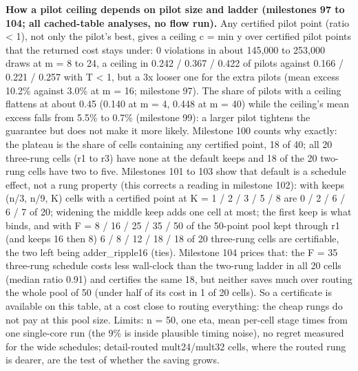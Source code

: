 \documentclass[conference]{IEEEtran}
\begin{document}
\textbf{How a pilot ceiling depends on pilot size and ladder (milestones
97 to 104; all cached-table analyses, no flow run).} Any certified pilot
point (ratio \textless{} 1), not only the pilot's best, gives a ceiling
c = min y over certified pilot points that the returned cost stays
under: 0 violations in about 145,000 to 253,000 draws at m = 8 to 24, a
ceiling in 0.242 / 0.367 / 0.422 of pilots against 0.166 / 0.221 / 0.257
with T \textless{} 1, but a 3x looser one for the extra pilots (mean
excess 10.2\% against 3.0\% at m = 16; milestone 97). The share of
pilots with a ceiling flattens at about 0.45 (0.140 at m = 4, 0.448 at m
= 40) while the ceiling's mean excess falls from 5.5\% to 0.7\%
(milestone 99): a larger pilot tightens the guarantee but does not make
it more likely. Milestone 100 counts why exactly: the plateau is the
share of cells containing any certified point, 18 of 40; all 20
three-rung cells (r1 to r3) have none at the default keeps and 18 of the
20 two-rung cells have two to five. Milestones 101 to 103 show that
default is a schedule effect, not a rung property (this corrects a
reading in milestone 102): with keeps (n/3, n/9, K) cells with a
certified point at K = 1 / 2 / 3 / 5 / 8 are 0 / 2 / 6 / 6 / 7 of 20;
widening the middle keep adds one cell at most; the first keep is what
binds, and with F = 8 / 16 / 25 / 35 / 50 of the 50-point pool kept
through r1 (and keeps 16 then 8) 6 / 8 / 12 / 18 / 18 of 20 three-rung
cells are certifiable, the two left being adder\_ripple16 (ties).
Milestone 104 prices that: the F = 35 three-rung schedule costs less
wall-clock than the two-rung ladder in all 20 cells (median ratio 0.91)
and certifies the same 18, but neither saves much over routing the whole
pool of 50 (under half of its cost in 1 of 20 cells). So a certificate
is available on this table, at a cost close to routing everything: the
cheap rungs do not pay at this pool size. Limits: n = 50, one eta, mean
per-cell stage times from one single-core run (the 9\% is inside
plausible timing noise), no regret measured for the wide schedules;
detail-routed mult24/mult32 cells, where the routed rung is dearer, are
the test of whether the saving grows.
\end{document}
